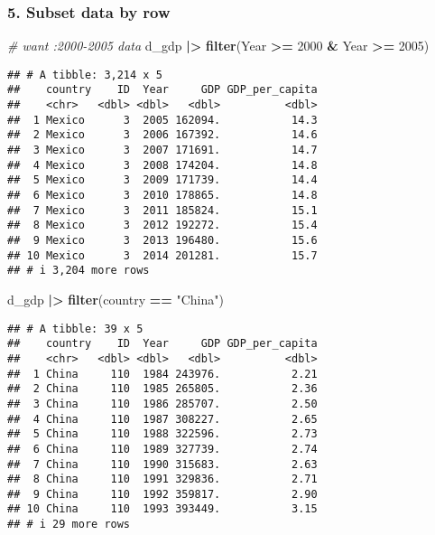 \documentclass[
]{article}
\newenvironment{Shaded}{\begin{snugshade}}{\end{snugshade}}
\newcommand{\CommentTok}[1]{\textcolor[rgb]{0.56,0.35,0.01}{\textit{#1}}}
\newcommand{\DecValTok}[1]{\textcolor[rgb]{0.00,0.00,0.81}{#1}}
\newcommand{\FunctionTok}[1]{\textcolor[rgb]{0.13,0.29,0.53}{\textbf{#1}}}
\newcommand{\NormalTok}[1]{#1}
\newcommand{\SpecialCharTok}[1]{\textcolor[rgb]{0.81,0.36,0.00}{\textbf{#1}}}
\newcommand{\StringTok}[1]{\textcolor[rgb]{0.31,0.60,0.02}{#1}}
\begin{document}
\hypertarget{subset-data-by-row}{%
\subsubsection{5. Subset data by row}\label{subset-data-by-row}}

\begin{Shaded}
\begin{Highlighting}[]
\CommentTok{\# want :2000{-}2005 data }
\NormalTok{d\_gdp }\SpecialCharTok{|\textgreater{}}
   \FunctionTok{filter}\NormalTok{(Year }\SpecialCharTok{\textgreater{}=} \DecValTok{2000} \SpecialCharTok{\&}\NormalTok{ Year }\SpecialCharTok{\textgreater{}=} \DecValTok{2005}\NormalTok{)}
\end{Highlighting}
\end{Shaded}

\begin{verbatim}
## # A tibble: 3,214 x 5
##    country    ID  Year     GDP GDP_per_capita
##    <chr>   <dbl> <dbl>   <dbl>          <dbl>
##  1 Mexico      3  2005 162094.           14.3
##  2 Mexico      3  2006 167392.           14.6
##  3 Mexico      3  2007 171691.           14.7
##  4 Mexico      3  2008 174204.           14.8
##  5 Mexico      3  2009 171739.           14.4
##  6 Mexico      3  2010 178865.           14.8
##  7 Mexico      3  2011 185824.           15.1
##  8 Mexico      3  2012 192272.           15.4
##  9 Mexico      3  2013 196480.           15.6
## 10 Mexico      3  2014 201281.           15.7
## # i 3,204 more rows
\end{verbatim}

\begin{Shaded}
\begin{Highlighting}[]
\NormalTok{d\_gdp }\SpecialCharTok{|\textgreater{}} 
  \FunctionTok{filter}\NormalTok{(country }\SpecialCharTok{==} \StringTok{"China"}\NormalTok{)}
\end{Highlighting}
\end{Shaded}

\begin{verbatim}
## # A tibble: 39 x 5
##    country    ID  Year     GDP GDP_per_capita
##    <chr>   <dbl> <dbl>   <dbl>          <dbl>
##  1 China     110  1984 243976.           2.21
##  2 China     110  1985 265805.           2.36
##  3 China     110  1986 285707.           2.50
##  4 China     110  1987 308227.           2.65
##  5 China     110  1988 322596.           2.73
##  6 China     110  1989 327739.           2.74
##  7 China     110  1990 315683.           2.63
##  8 China     110  1991 329836.           2.71
##  9 China     110  1992 359817.           2.90
## 10 China     110  1993 393449.           3.15
## # i 29 more rows
\end{verbatim}
\end{document}
